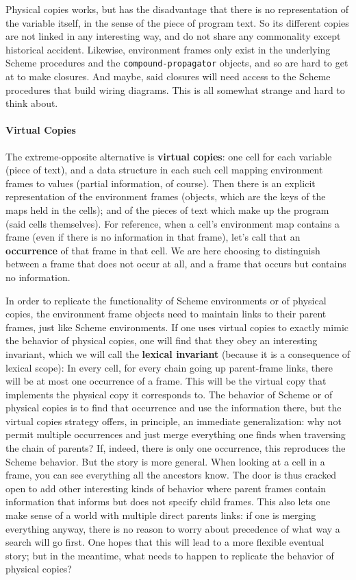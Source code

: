 \documentclass{article}
\newcommand{\code}[1]{{\tt #1}}
\newcommand{\defn}[1]{{\bfseries{#1}}}
\begin{document}
Physical copies works, but has the disadvantage that there is
no representation of the variable itself, in the sense of the
piece of program text.  So its different copies are not linked in
any interesting way, and do not share any commonality except
historical accident.  Likewise, environment frames only exist in
the underlying Scheme procedures and the \code{compound-propagator}
objects, and so are hard to get at to make closures.  And maybe,
said closures will need access to the Scheme procedures that build
wiring diagrams.  This is all somewhat strange and hard to think
about.

\paragraph{Virtual Copies}
The extreme-opposite alternative is \defn{virtual copies}: one cell
for each variable (piece of text), and a data structure in each such
cell mapping environment frames to values (partial information, of
course).  Then there is an explicit representation of the environment
frames (objects, which are the keys of the maps held in the cells);
and of the pieces of text which make up the program (said cells
themselves).  For reference, when a cell's environment map contains a
frame (even if there is no information in that frame), let's call that
an \defn{occurrence} of that frame in that cell.  We are here choosing
to distinguish between a frame that does not occur at all, and a frame
that occurs but contains no information.

In order to replicate the functionality of Scheme environments or of
physical copies, the environment frame objects need to maintain links
to their parent frames, just like Scheme environments.  If one uses
virtual copies to exactly mimic the behavior of physical copies, one
will find that they obey an interesting invariant, which we will call
the \defn{lexical invariant} (because it is a consequence of lexical
scope): In every cell, for every chain going up parent-frame links,
there will be at most one occurrence of a frame.  This will be the
virtual copy that implements the physical copy it corresponds to.  The
behavior of Scheme or of physical copies is to find that occurrence
and use the information there, but the virtual copies strategy offers,
in principle, an immediate generalization: why not permit multiple
occurrences and just merge everything one finds when traversing the
chain of parents?  If, indeed, there is only one occurrence, this
reproduces the Scheme behavior.  But the story is more general.  When
looking at a cell in a frame, you can see everything all the ancestors
know.  The door is thus cracked open to add other interesting kinds of
behavior where parent frames contain information that informs but does
not specify child frames.  This also lets one make sense of a world
with multiple direct parents links: if one is merging everything
anyway, there is no reason to worry about precedence of what way a
search will go first.  One hopes that this will lead to a more
flexible eventual story; but in the meantime, what needs to happen to
replicate the behavior of physical copies?
\end{document}
